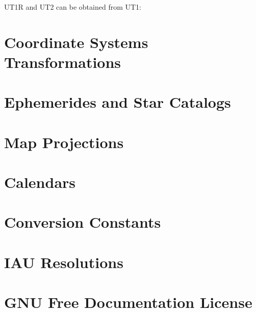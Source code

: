 \documentclass[a4paper,11pt,bibliography=totoc]{scrreport}
\begin{document}
\gls{UT1R} and \gls{UT2} can be obtained from \gls{UT1}:





\chapter{Coordinate Systems Transformations}\label{CoordinateSystemsTransformations}

\chapter{Ephemerides and Star Catalogs}\label{EphemeridesAndStarCatalogs}

\chapter{Map Projections}\label{MapProjections}

\chapter{Calendars}\label{Calendars}

\appendix
\chapter{Conversion Constants}\label{Conversion Constants}

\chapter{IAU Resolutions}\label{IAU Resolutions}
	
\chapter{GNU Free Documentation License}\label{License}



\printglossary
\end{document}
